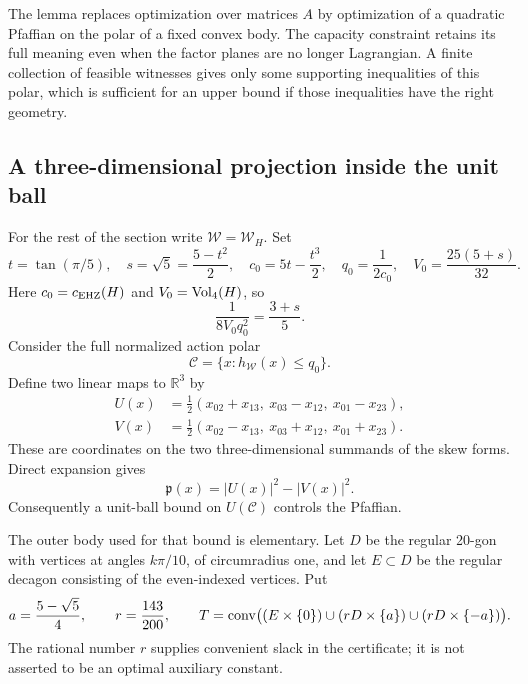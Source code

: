 The lemma replaces optimization over matrices $A$ by optimization of a
quadratic Pfaffian on the polar of a fixed convex body. The capacity
constraint retains its full meaning even when the factor planes are no
longer Lagrangian. A finite collection of feasible witnesses gives only
some supporting inequalities of this polar, which is sufficient for an
upper bound if those inequalities have the right geometry.

\subsection{A three-dimensional projection inside the unit ball}

For the rest of the section write $\mathcal W=\mathcal W_H$. Set
\[
 t=\tan(\pi/5),\quad s=\sqrt5=\frac{5-t^2}{2},\quad
 c_0=5t-\frac{t^3}{2},\quad q_0=\frac1{2c_0},\quad
 V_0=\frac{25(5+s)}{32}.
\]
Here $c_0=c_{\mathrm{EHZ}}(H)$ and $V_0=\operatorname{Vol}_4(H)$, so
\begin{equation}
 \frac1{8V_0q_0^2}=\frac{3+s}{5}.
 \label{eq:affine-hko-normalization}
\end{equation}
Consider the full normalized action polar
\[
 \mathcal C=\{x:h_{\mathcal W}(x)\leq q_0\}.
\]
Define two linear maps to $\mathbb R^3$ by
\begin{align}
 U(x)&=\frac12(x_{02}+x_{13},\ x_{03}-x_{12},\ x_{01}-x_{23}),
 \label{eq:affine-U}\\
 V(x)&=\frac12(x_{02}-x_{13},\ x_{03}+x_{12},\ x_{01}+x_{23}).
 \nonumber
\end{align}
These are coordinates on the two three-dimensional summands of the skew
forms. Direct expansion gives
\begin{equation}
 \mathfrak p(x)=|U(x)|^2-|V(x)|^2.
 \label{eq:affine-split-norm}
\end{equation}
Consequently a unit-ball bound on $U(\mathcal C)$ controls the Pfaffian.

The outer body used for that bound is elementary. Let $D$ be the regular
20-gon with vertices at angles $k\pi/10$, of circumradius one, and let
$E\subset D$ be the regular decagon consisting of the even-indexed vertices.
Put
\begin{equation}
 a=\frac{5-\sqrt5}{4},\qquad r=\frac{143}{200},\qquad
 T=\operatorname{conv}\bigl((E\times\{0\})\cup(rD\times\{a\})
                         \cup(rD\times\{-a\})\bigr).
 \label{eq:affine-outer-body}
\end{equation}
The rational number $r$ supplies convenient slack in the certificate; it
is not asserted to be an optimal auxiliary constant.

